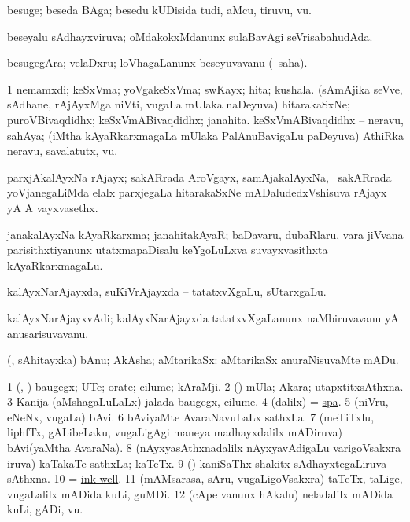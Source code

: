 \bentry
{} 
\gl{\nA}
\expl{}
\bmng
besuge; beseda BAga; besedu kUDisida tudi, aMcu, tiruvu, \mo vu. 
\emng
\eentry

\bentry
{} 
\gl{\gu}
\expl{}
\bmng
beseyalu sAdhayxviruva; oMdakokxMdanunx sulaBavAgi seVrisabahudAda. 
\emng
\eentry

\bentry
{} 
\gl{\nA}
\expl{}
\bmng
besugegAra; velaDxru; loVhagaLanunx beseyuvavanu (\rUpa\ saha). 
\emng
\eentry

\bentry
{} 
\gl{\nA}
\expl{}
\bmng
\bnum
\num{1} nemamxdi; keSxVma; yoVgakeSxVma; swKayx; hita; kushala. 
  
\banum
{} (sAmAjika seVve, sAdhane, rAjAyxMga niVti, \mo vugaLa mUlaka naDeyuva) hitarakaSxNe; puroVBivaqdidhx; keSxVmABivaqdidhx; janahita. 
 keSxVmABivaqdidhx -- neravu, sahAya; (iMtha kAyaRkarxmagaLa mUlaka PalAnuBavigaLu paDeyuva) AthiRka neravu, savalatutx, \mo vu. 
\eanum
\numie
\enum
\emng
\eentry

\bentry
{} 
\gl{\nA}
\expl{}
\bmng
parxjAkalAyxNa rAjayx; sakARrada AroVgayx, samAjakalAyxNa, \mo\ sakARrada yoVjanegaLiMda elalx parxjegaLa hitarakaSxNe mADaludedxVshisuva rAjayx yA A vayxvasethx. 
\emng
\eentry

\bentry
{} 
\gl{\nA}
\expl{}
\bmng
janakalAyxNa kAyaRkarxma; janahitakAyaR; baDavaru, dubaRlaru, \mo vara jiVvana parisithxtiyanunx utatxmapaDisalu keYgoLuLxva suvayxvasithxta kAyaRkarxmagaLu. 
\emng
\eentry

\bentry
{} 
\gl{\nA}
\expl{}
\bmng
kalAyxNarAjayxda, suKiVrAjayxda -- tatatxvXgaLu, sUtarxgaLu. 
\emng
\eentry

\bentry
{} 
\gl{\nA}
\expl{}
\bmng
kalAyxNarAjayxvAdi; kalAyxNarAjayxda tatatxvXgaLanunx naMbiruvavanu yA anusarisuvavanu. 
\emng
\eentry

\bentry
{} 
\gl{\nA}
\expl{}
\bmng
(\kAparx, sAhitayxka) bAnu; AkAsha; aMtarikaSx:  aMtarikaSx anuraNisuvaMte mADu. 
\emng
\eentry

\bentry
{} 
\gl{\nA}
\expl{}
\bmng
\bnum
\num{1} (\kAparx, \pArxparx) baugegx; UTe; orate; cilume; kAraMji. 
\num{2} (\rUpa) mUla; Akara; utapxtitxsAthxna. 
\num{3} Kanija (aMshagaLuLaLx) jalada baugegx, cilume. 
\num{4} (\bava dalilx) = \hyperref{kandict_s.pdf}{S}{spa}{spa}. 
\num{5} (niVru, eNeNx, \mo vugaLa) bAvi. 
\num{6} bAviyaMte AvaraNavuLaLx sathxLa. 
\num{7} (meTiTxlu, liphfTx, gALibeLaku, \mo vugaLigAgi maneya madhayxdalilx mADiruva) bAvi(yaMtha AvaraNa). 
\num{8} (nAyxyasAthxnadalilx nAyxyavAdigaLu \mo varigoVsakxra iruva) kaTakaTe sathxLa; kaTeTx. 
\num{9} (\Bwvi) kaniSaThx shakitx sAdhayxtegaLiruva sAthxna. 
\num{10} = \hyperref{kandict_i.pdf}{I}{ink-well}{ink-well}. 
\num{11} (mAMsarasa, sAru, \mo vugaLigoVsakxra) taTeTx, taLige, \mo vugaLalilx mADida kuLi, guMDi. 
\num{12} (cApe \mo vanunx hAkalu) neladalilx mADida kuLi, gADi, \mo vu. 
\enum
\emng

